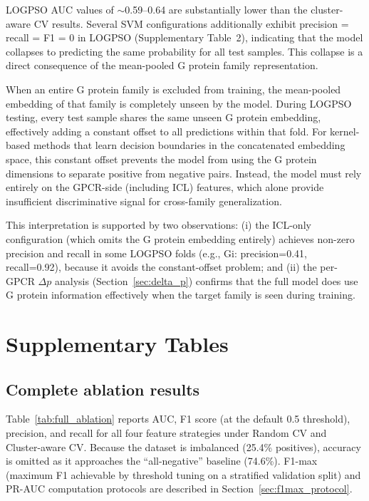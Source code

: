 \documentclass[11pt,a4paper]{article}
\begin{document}
LOGPSO AUC values of $\sim$0.59--0.64 are substantially lower than the cluster-aware CV results. Several SVM configurations additionally exhibit precision = recall = F1 = 0 in LOGPSO (Supplementary Table~2), indicating that the model collapses to predicting the same probability for all test samples. This collapse is a direct consequence of the mean-pooled G protein family representation.

When an entire G protein family is excluded from training, the mean-pooled embedding of that family is completely unseen by the model. During LOGPSO testing, every test sample shares the same unseen G protein embedding, effectively adding a constant offset to all predictions within that fold. For kernel-based methods that learn decision boundaries in the concatenated embedding space, this constant offset prevents the model from using the G protein dimensions to separate positive from negative pairs. Instead, the model must rely entirely on the GPCR-side (including ICL) features, which alone provide insufficient discriminative signal for cross-family generalization.

This interpretation is supported by two observations: (i) the ICL-only configuration (which omits the G protein embedding entirely) achieves non-zero precision and recall in some LOGPSO folds (e.g., Gi: precision=0.41, recall=0.92), because it avoids the constant-offset problem; and (ii) the per-GPCR $\Delta p$ analysis (Section~\ref{sec:delta_p}) confirms that the full model does use G protein information effectively when the target family is seen during training.

\section{Supplementary Tables}

\subsection{Complete ablation results}

Table~\ref{tab:full_ablation} reports AUC, F1 score (at the default 0.5 threshold), precision, and recall for all four feature strategies under Random CV and Cluster-aware CV. Because the dataset is imbalanced (25.4\% positives), accuracy is omitted as it approaches the ``all-negative'' baseline (74.6\%). F1-max (maximum F1 achievable by threshold tuning on a stratified validation split) and PR-AUC computation protocols are described in Section~\ref{sec:f1max_protocol}.
\end{document}

